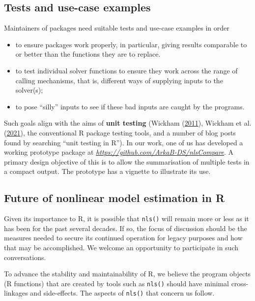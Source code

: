 \documentclass[
]{article}
\providecommand{\tightlist}{%
  \setlength{\itemsep}{0pt}\setlength{\parskip}{0pt}}
\begin{document}
\hypertarget{tests-and-use-case-examples}{%
\subsection{Tests and use-case
examples}\label{tests-and-use-case-examples}}

Maintainers of packages need suitable tests and use-case examples in
order

\begin{itemize}
\tightlist
\item
  to ensure packages work properly, in particular, giving results
  comparable to or better than the functions they are to replace.
\item
  to test individual solver functions to ensure they work across the
  range of calling mechanisms, that is, different ways of supplying
  inputs to the solver(s);
\item
  to pose ``silly'' inputs to see if these bad inputs are caught by the
  programs.
\end{itemize}

Such goals align with the aims of \textbf{unit testing} (Wickham
(\protect\hyperlink{ref-HWtestthat11}{2011}), Wickham et al.
(\protect\hyperlink{ref-HWdevtools21}{2021}), the conventional R package
testing tools, and a number of blog posts found by searching ``unit
testing in R''). In our work, one of us has developed a working
prototype package at
\emph{\url{https://github.com/ArkaB-DS/nlsCompare}}. A primary design
objective of this is to allow the summarisation of multiple tests in a
compact output. The prototype has a vignette to illustrate its use.

\hypertarget{future-of-nonlinear-model-estimation-in-r}{%
\subsection{Future of nonlinear model estimation in
R}\label{future-of-nonlinear-model-estimation-in-r}}

Given its importance to R, it is possible that \texttt{nls()} will
remain more or less as it has been for the past several decades. If so,
the focus of discussion should be the measures needed to secure its
continued operation for legacy purposes and how that may be
accomplished. We welcome an opportunity to participate in such
conversations.

To advance the stability and maintainability of R, we believe the
program objects (R functions) that are created by tools such as
\texttt{nls()} should have minimal cross-linkages and side-effects. The
aspects of \texttt{nls()} that concern us follow.
\end{document}
